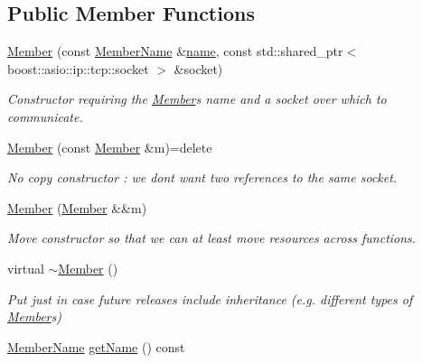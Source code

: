 \subsection*{Public Member Functions}
\begin{DoxyCompactItemize}
\item 
\hyperlink{classshaan97_1_1sync_1_1_member_a91815e1d9917567048adae8945dabc3a}{Member} (const \hyperlink{namespaceshaan97_1_1sync_af59c2c9185f7cde547b79fbe0bf8ec71}{Member\+Name} \&\hyperlink{classshaan97_1_1sync_1_1_member_a42e3bc15f330702c4deac3dab4220c9b}{name}, const std\+::shared\+\_\+ptr$<$ boost\+::asio\+::ip\+::tcp\+::socket $>$ \&socket)
\begin{DoxyCompactList}\small\item\em Constructor requiring the \hyperlink{classshaan97_1_1sync_1_1_member}{Member}\textquotesingle{}s name and a socket over which to communicate. \end{DoxyCompactList}\item 
\hyperlink{classshaan97_1_1sync_1_1_member_abc7be29728dcc0e24be2f6d0f07f74f5}{Member} (const \hyperlink{classshaan97_1_1sync_1_1_member}{Member} \&m)=delete
\begin{DoxyCompactList}\small\item\em No copy constructor \+: we don\textquotesingle{}t want two references to the same socket. \end{DoxyCompactList}\item 
\hyperlink{classshaan97_1_1sync_1_1_member_a1a431ee2c09919b3f0243999078814ce}{Member} (\hyperlink{classshaan97_1_1sync_1_1_member}{Member} \&\&m)
\begin{DoxyCompactList}\small\item\em Move constructor so that we can at least move resources across functions. \end{DoxyCompactList}\item 
virtual \hyperlink{classshaan97_1_1sync_1_1_member_a4f5d7cb8788247f65f10b5b81be4a4ab}{$\sim$\+Member} ()
\begin{DoxyCompactList}\small\item\em Put just in case future releases include inheritance (e.\+g. different types of {\ttfamily \hyperlink{classshaan97_1_1sync_1_1_member}{Member}}s) \end{DoxyCompactList}\item 
\hyperlink{namespaceshaan97_1_1sync_af59c2c9185f7cde547b79fbe0bf8ec71}{Member\+Name} \hyperlink{classshaan97_1_1sync_1_1_member_a6da04a28e6295aecaf57676f7139a2a2}{get\+Name} () const

\end{DoxyCompactItemize}
